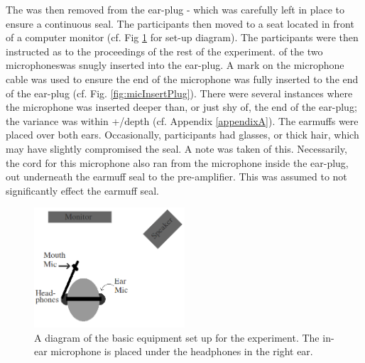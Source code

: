 The \DIFdelbegin {}\DIFdelend \DIFaddbegin {}\DIFaddend was then removed from the ear-plug - which was carefully left in place to ensure a continuous seal.  The participants then moved to a seat located in front of a computer monitor (cf. Fig \ref{fig:overallSetUp} for set-up diagram).  The participants were then instructed as to the proceedings of the rest of the experiment. \DIFdelbegin {}\DIFdelend \DIFaddbegin {}\DIFaddend of the two microphones\DIFdelbegin {}\DIFdelend \DIFaddbegin {}\DIFaddend was snugly inserted into the ear-plug.  A mark on the microphone cable was used to ensure the end of the microphone was fully inserted to the end of the ear-plug (cf. Fig. \ref{fig:micInsertPlug}).  There were several instances where the microphone was inserted deeper than, or just shy of, the end of the ear-plug; the variance was within +/\DIFdelbegin \DIFdel{-2mm }\DIFdelend \DIFaddbegin \DIFadd{-2 mm }\DIFaddend depth (cf. Appendix \ref{appendixA}).  The earmuffs were placed over both ears.  Occasionally, participants had glasses, or thick hair, which may have slightly compromised the seal.  A note was taken of this. Necessarily, the cord for this microphone also ran from the microphone inside the ear-plug, out underneath the earmuff seal to the pre-amplifier.  This was assumed to not significantly effect the earmuff seal.

\begin{figure}
\includegraphics[width=0.5\textwidth]{figure/overallSetUp.png}
\caption{A diagram of the basic equipment set up for the experiment.  The in-ear microphone is placed under the headphones in the right ear.}
\label{fig:overallSetUp}
\end{figure}

